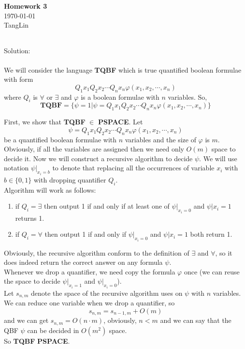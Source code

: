 \documentclass[a4papper]{article}
\theoremstyle{neosn}
\begin{document}
    \begin{center}
    {\bf Homework 3} \\
        \today \\
        TangLin
    \end{center}

    \\

    Solution: \\

    \\

    We will consider the language \textbf{TQBF} which is true quantified boolean formulae with form
    \[
        Q_1x_1Q_2x_2\cdots Q_n x_n \varphi(x_1, x_2, \cdots, x_n)
    \]
    where $Q_i$ is $\forall$ or $\exists$ and $\varphi$ is a boolean formulae with $n$ variables.
    So,
    \[
        \textbf{TQBF} = \{\psi = 1| \psi = Q_1x_1Q_2x_2\cdots Q_n x_n \varphi(x_1, x_2, \cdots, x_n)\}
    \]

    First, we show that \textbf{TQBF} $\in$ \textbf{PSPACE}.
    Let
    \[
        \psi = Q_1x_1Q_2x_2\cdots Q_n x_n \varphi(x_1, x_2, \cdots, x_n)
    \]
    be a quantified boolean formulae with $n$ variables and the size of $\varphi$ is $m$.
    Obviously, if all the variables are assigned then we need only $O(m)$ space to decide it.
    Now we will construct a recursive algorithm to decide $\psi$.
    We will use notation $\psi|_{x_i = b}$ to denote that replacing all the occurrences of variable
    $x_i$ with $b \in \{0,1\}$ with dropping quantifier $Q_i$. \\
    Algorithm will work as follows:\\
    \begin{enumerate}
        \item if $Q_i = \exists$ then output 1 if and only if at least one of $\psi|_{x_i=0}$ and
        $\psi|{x_i = 1}$ returns 1.
        \item if $Q_i = \forall$ then output 1 if and only if $\psi|_{x_i=0}$ and
        $\psi|{x_i = 1}$ both return 1.
    \end{enumerate}
    Obviously, the recursive algorithm conform to the definition of $\exists$ and $\forall$, so
    it does indeed return the correct answer on any formula $\psi$. \\
    Whenever we drop a quantifier, we need copy the formula $\varphi$ once (we can reuse the space
    to decide $\psi|_{x_i=1}$ and $\psi | _{x_i = 0}$). \\
    Let $s_{n,m}$ denote the space of the recursive algorithm uses on $\psi$ with $n$ variables.
    We can reduce one variable when we drop a quantifier, so
    \[
        s_{n,m} = s_{n-1,m} + O(m)
    \]
    and we can get $s_{n,m} = O(n\cdot m)$, obviously, $n < m$ and we can say that
    the QBF $\psi$ can be decided in $O(m^2)$ space. \\
    So \textbf{TQBF} \in \textbf{PSPACE}. \\
\end{document}

